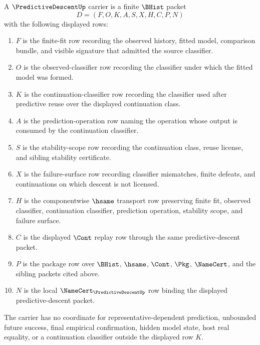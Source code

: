 \begin{definition}
\label{def:predictive-descent-carrier}
A $\PredictiveDescentUp$ carrier is a finite $\BHist$ packet
$$
D=(F,O,K,A,S,X,H,C,P,N)
$$
with the following displayed rows:
\begin{enumerate}
\item $F$ is the finite-fit row recording the observed history, fitted model, comparison bundle, and visible signature that admitted the source classifier.
\item $O$ is the observed-classifier row recording the classifier under which the fitted model was formed.
\item $K$ is the continuation-classifier row recording the classifier used after predictive reuse over the displayed continuation class.
\item $A$ is the prediction-operation row naming the operation whose output is consumed by the continuation classifier.
\item $S$ is the stability-scope row recording the continuation class, reuse license, and sibling stability certificate.
\item $X$ is the failure-surface row recording classifier mismatches, finite defeats, and continuations on which descent is not licensed.
\item $H$ is the componentwise $\hsame$ transport row preserving finite fit, observed classifier, continuation classifier, prediction operation, stability scope, and failure surface.
\item $C$ is the displayed $\Cont$ replay row through the same predictive-descent packet.
\item $P$ is the package row over $\BHist$, $\hsame$, $\Cont$, $\Pkg$, $\NameCert$, and the sibling packets cited above.
\item $N$ is the local $\NameCert_{\PredictiveDescentUp}$ row binding the displayed predictive-descent packet.
\end{enumerate}
The carrier has no coordinate for representative-dependent prediction, unbounded future success, final empirical confirmation, hidden model state, host real equality, or a continuation classifier outside the displayed row $K$.
\end{definition}

